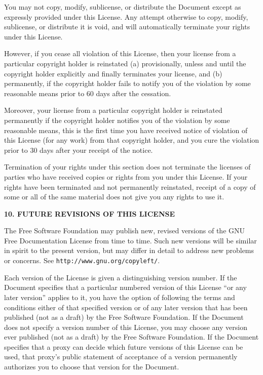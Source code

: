 \begin{scriptsize}
\begin{multicols}{2}
    You may not copy, modify, sublicense, or distribute the Document except as expressly provided under this License.  Any attempt otherwise to copy, modify, sublicense, or distribute it is void, and will automatically terminate your rights under this License.

    However, if you cease all violation of this License, then your license from a particular copyright holder is reinstated (a) provisionally, unless and until the copyright holder explicitly and finally terminates your license, and (b) permanently, if the copyright holder fails to notify you of the violation by some reasonable means prior to 60 days after the cessation.

    Moreover, your license from a particular copyright holder is reinstated permanently if the copyright holder notifies you of the violation by some reasonable means, this is the first time you have received notice of violation of this License (for any work) from that copyright holder, and you cure the violation prior to 30 days after your receipt of the notice.

    Termination of your rights under this section does not terminate the licenses of parties who have received copies or rights from you under this License. If your rights have been terminated and not permanently reinstated, receipt of a copy of some or all of the same material does not give you any rights to use it.

    \begin{center}
      {\bf 10. FUTURE REVISIONS OF THIS LICENSE\par}
    \end{center}

    The Free Software Foundation may publish new, revised versions of the GNU Free Documentation License from time to time.  Such new versions will be similar in spirit to the present version, but may differ in detail to address new problems or concerns. See \texttt{http://www.gnu.org/copyleft/}.

    Each version of the License is given a distinguishing version number. If the Document specifies that a particular numbered version of this License ``or any later version'' applies to it, you have the option of following the terms and conditions either of that specified version or of any later version that has been published (not as a draft) by the Free Software Foundation.  If the Document does not specify a version number of this License, you may choose any version ever published (not as a draft) by the Free Software Foundation.  If the Document specifies that a proxy can decide which future versions of this License can be used, that proxy's public statement of acceptance of a version permanently authorizes you to choose that version for the Document.


\end{multicols}
\end{scriptsize}
